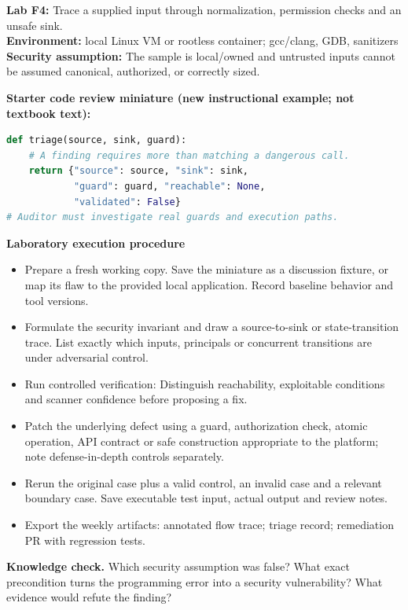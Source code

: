 \documentclass[10pt,letterpaper]{article}
\begin{document}
\begin{insight}\textbf{Lab F4:} Trace a supplied input through normalization, permission checks and an unsafe sink.\\\textbf{Environment:} local Linux VM or rootless container; gcc/clang, GDB, sanitizers\\\textbf{Security assumption:} The sample is local/owned and untrusted inputs cannot be assumed canonical, authorized, or correctly sized.\end{insight}
\textbf{Starter code review miniature (new instructional example; not textbook text):}
\begin{lstlisting}[language=Python]
def triage(source, sink, guard):
    # A finding requires more than matching a dangerous call.
    return {"source": source, "sink": sink,
            "guard": guard, "reachable": None,
            "validated": False}
# Auditor must investigate real guards and execution paths.
\end{lstlisting}
\textbf{Laboratory execution procedure}
\begin{itemize}[leftmargin=*,itemsep=2pt]
\item Prepare a fresh working copy. Save the miniature as a discussion fixture, or map its flaw to the provided local application. Record baseline behavior and tool versions.
\item Formulate the security invariant and draw a source-to-sink or state-transition trace. List exactly which inputs, principals or concurrent transitions are under adversarial control.
\item Run controlled verification: Distinguish reachability, exploitable conditions and scanner confidence before proposing a fix.
\item Patch the underlying defect using a guard, authorization check, atomic operation, API contract or safe construction appropriate to the platform; note defense-in-depth controls separately.
\item Rerun the original case plus a valid control, an invalid case and a relevant boundary case. Save executable test input, actual output and review notes.
\item Export the weekly artifacts: annotated flow trace; triage record; remediation PR with regression tests.
\end{itemize}
\textbf{Knowledge check.} Which security assumption was false? What exact precondition turns the programming error into a security vulnerability? What evidence would refute the finding?
\end{document}
